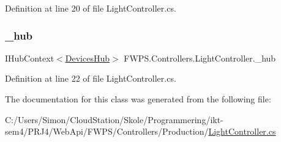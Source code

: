 Definition at line 20 of file Light\+Controller.\+cs.

\mbox{\label{class_f_w_p_s_1_1_controllers_1_1_light_controller_acc736d9ae6f36836ea91fc7be5d8e4ac}} 
\subsubsection{\texorpdfstring{\+\_\+hub}{\_hub}}
{\footnotesize\ttfamily I\+Hub\+Context$<$\mbox{\hyperlink{class_f_w_p_s_1_1_devices_hub}{Devices\+Hub}}$>$ F\+W\+P\+S.\+Controllers.\+Light\+Controller.\+\_\+hub\hspace{0.3cm}{\ttfamily [private]}}



Definition at line 22 of file Light\+Controller.\+cs.



The documentation for this class was generated from the following file\+:\begin{DoxyCompactItemize}
\item 
C\+:/\+Users/\+Simon/\+Cloud\+Station/\+Skole/\+Programmering/ikt-\/sem4/\+P\+R\+J4/\+Web\+Api/\+F\+W\+P\+S/\+Controllers/\+Production/\mbox{\hyperlink{_light_controller_8cs}{Light\+Controller.\+cs}}\end{DoxyCompactItemize}
